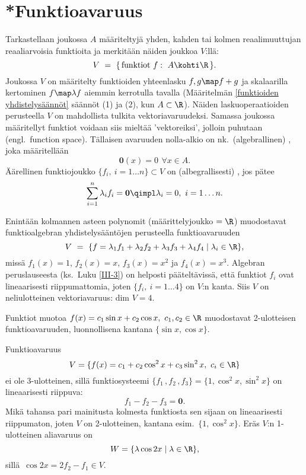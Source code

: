 \section{*Funktioavaruus} \label{funktioavaruus}
\alku
{}

Tarkastellaan  joukossa $A$ määriteltyjä yhden, kahden tai kolmen 
reaalimuuttujan reaaliarvoisia funktioita ja merkitään näiden joukkoa $V$:llä:
\[ 
V\ =\ \{\,\text{funktiot}\ f:\ A \kohti \R\,\}.
\]
Joukossa $V$ on määritelty funktioiden yhteenlasku $f,g \map f+g$ ja skalaarilla kertominen
$f \map \lambda f$ aiemmin kerrotulla tavalla (Määritelmän \ref{funktioiden yhdistelysäännöt}
säännöt (1) ja (2), kun $A \subset \R$). Näiden laskuoperaatioiden perusteella $V$ on
%
mahdollista tulkita vektoriavaruudeksi. Samassa joukossa määritellyt funktiot voidaan siis 
mieltää 'vektoreiksi', jolloin puhutaan  (engl.\ function space). 
%
Tällaisen avaruuden nolla-alkio on nk.\ (algebrallinen) , joka määritellään
\[ 
\mathbf{0}(x) = 0\,\ \forall x \in A .
\]
Äärellinen funktiojoukko $\{ f_i,\ i = 1 \ldots n\} \subset V$ on (albegrallisesti) 
%
, jos pätee
\[ 
\sum_{i=1}^n \lambda_i f_i = \mathbf{0} \qimpl \lambda_i = 0,\ i = 1 \ldots n. 
\]
\begin{Exa} Enintään kolmannen asteen polynomit (määrittelyjoukko $= \R$) muodostavat 
funktioalgebran yhdistelysääntöjen perusteella funktioavaruuden
\[
V\ =\ \{ f = \lambda_1 f_1 + \lambda_2 f_2 + \lambda_3 f_3 + \lambda_4 f_4 
                                                                   \mid \lambda_i \in \R \},
\]
missä $f_1(x) = 1$, $f_2(x) = x$, $f_3(x) = x^2$ ja  $f_4(x) = x^3$. Algebran
peruslauseesta (ks.\ Luku \ref{III-3}) on helposti pääteltävissä, että funktiot $f_i$ ovat
lineaarisesti riippumattomia, joten $\{f_i,\ i = 1 \ldots 4\}$ on $V$:n kanta. Siis $V$ on
neliulotteinen vektoriavaruus: dim $V = 4$. \loppu \end{Exa}
\begin{Exa} Funktiot muotoa $f(x)=c_1\sin x+c_2\cos x,\ c_1,c_2\in\R$ muodostavat 2-ulotteisen
funktioavaruuden, luonnollisena kantana $\{\sin x,\cos x\}$. \loppu
\end{Exa}
\begin{Exa} Funktioavaruus
\[
V=\{f(x)=c_1+c_2\cos^2 x+c_3\sin^2 x,\ c_i\in\R\}
\]
ei ole 3-ulotteinen, sillä funktiosysteemi $\{f_1\,,f_2\,,f_3\}=\{1,\cos^2 x,\sin^2 x\}$ on 
lineaarisesti riippuva:
\[
f_1-f_2-f_3=\mathbf{0}.
\]
Mikä tahansa pari mainitusta kolmesta funktiosta sen sijaan on lineaarisesti riippumaton,
joten $V$ on 2-ulotteinen, kantana esim.\ $\{1,\cos^2 x\}$. Eräs $V$:n 1-ulotteinen aliavaruus
on
\[
W=\{\lambda\cos 2x \mid \lambda\in\R\},
\]
sillä $\,\cos 2x=2f_2-f_1 \in V$. \loppu
\end{Exa}
